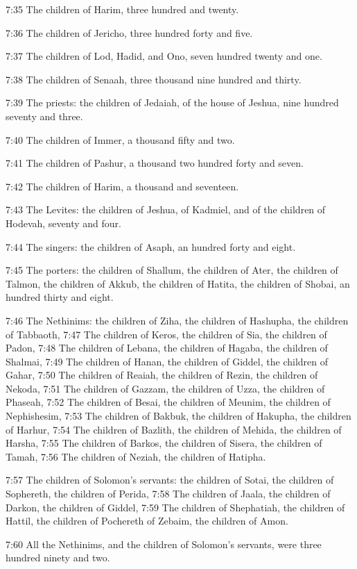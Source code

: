 7:35 The children of Harim, three hundred and twenty.

7:36 The children of Jericho, three hundred forty and five.

7:37 The children of Lod, Hadid, and Ono, seven hundred twenty and
one.

7:38 The children of Senaah, three thousand nine hundred and thirty.

7:39 The priests: the children of Jedaiah, of the house of Jeshua,
nine hundred seventy and three.

7:40 The children of Immer, a thousand fifty and two.

7:41 The children of Pashur, a thousand two hundred forty and seven.

7:42 The children of Harim, a thousand and seventeen.

7:43 The Levites: the children of Jeshua, of Kadmiel, and of the
children of Hodevah, seventy and four.

7:44 The singers: the children of Asaph, an hundred forty and eight.

7:45 The porters: the children of Shallum, the children of Ater, the
children of Talmon, the children of Akkub, the children of Hatita, the
children of Shobai, an hundred thirty and eight.

7:46 The Nethinims: the children of Ziha, the children of Hashupha,
the children of Tabbaoth, 7:47 The children of Keros, the children of
Sia, the children of Padon, 7:48 The children of Lebana, the children
of Hagaba, the children of Shalmai, 7:49 The children of Hanan, the
children of Giddel, the children of Gahar, 7:50 The children of
Reaiah, the children of Rezin, the children of Nekoda, 7:51 The
children of Gazzam, the children of Uzza, the children of Phaseah,
7:52 The children of Besai, the children of Meunim, the children of
Nephishesim, 7:53 The children of Bakbuk, the children of Hakupha, the
children of Harhur, 7:54 The children of Bazlith, the children of
Mehida, the children of Harsha, 7:55 The children of Barkos, the
children of Sisera, the children of Tamah, 7:56 The children of
Neziah, the children of Hatipha.

7:57 The children of Solomon's servants: the children of Sotai, the
children of Sophereth, the children of Perida, 7:58 The children of
Jaala, the children of Darkon, the children of Giddel, 7:59 The
children of Shephatiah, the children of Hattil, the children of
Pochereth of Zebaim, the children of Amon.

7:60 All the Nethinims, and the children of Solomon's servants, were
three hundred ninety and two.

